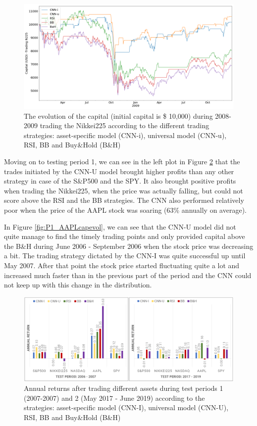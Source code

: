 \documentclass[12pt, a4paper]{article}
\begin{document}
\begin{figure}[ht]
    \centering
    \includegraphics[width=.97\textwidth]{images/capitals/Capitals2_N225.png}
    \caption{The evolution of the capital (initial capital is \$ 10,000) during 2008-2009 trading the Nikkei225 according to the different trading strategies: asset-specific model (CNN-i), universal model (CNN-u), RSI, BB and Buy\&Hold (B\&H)}
    \label{fig:N225capevol}
\end{figure}

Moving on to testing period 1, we can see in the left plot in Figure \ref{fig:CNNvsComp_P1P3} that the trades initiated by the CNN-U model brought higher profits than any other strategy in case of the S\&P500 and the SPY. It also brought positive profits when trading the Nikkei225, when the price was actually falling, but could not score above the RSI and the BB strategies. The CNN also performed relatively poor when the price of the AAPL stock was soaring (63\% annually on average). 

In Figure \ref{fig:P1_AAPLcapevol}, we can see that the CNN-U model did not quite manage to find the timely trading points and only provided capital above the B\&H during June 2006 - September 2006 when the stock price was decreasing a bit. The trading strategy dictated by the CNN-I was quite successful up until May 2007. After that point the stock price started fluctuating quite a lot and increased much faster than in the previous part of the period and the CNN could not keep up with this change in the distribution. 

\begin{figure}[H]
    \centering
    \includegraphics[width=\textwidth]{images/CNNvsComp_P1P3.png}
    \caption{Annual returns after trading different assets during test periods 1 (2007-2007) and 2 (May 2017 - June 2019) according to the strategies: asset-specific model (CNN-I), universal model (CNN-U), RSI, BB and Buy\&Hold (B\&H)}
    \label{fig:CNNvsComp_P1P3}
\end{figure}
\end{document}
